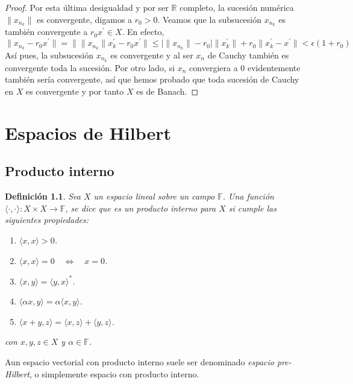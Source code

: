 \documentclass[12pt]{book}
\newtheorem{defn}{\bf Definición}[chapter]
\def\RR{\mathbb{R}}
\def\FF{\mathbb{F}}
\newcommand{\abs}[1]{\lvert #1\rvert }
\newcommand{\norm}[1]{\lVert #1\rVert }
\begin{document}
\begin{proof}
Por esta última desigualdad y por ser $\RR$ completo, la sucesión numérica $\norm{x_{n_k}}$ es convergente, digamos a $r_0>0$. Veamos que la subsucesión $x_{n_k}$ es también convergente a  $r_0 x^\prime \in X$. En efecto,
$$\norm{x_{n_k}-r_0 x^\prime}=\norm{\norm{x_{n_k}} x^\prime_k -r_0x^\prime}\leq \abs{\norm{x_{n_k}} -r_0}\norm{x^\prime_k}+r_0\norm{x^\prime_k- x^\prime} < \epsilon (1 + r_0)$$ 
Así pues, la subsucesión $x_{n_k}$  es convergente y al ser  $x_n$ de Cauchy también es convergente toda la sucesión. Por otro lado, si  $x_n$ convergiera a $0$ evidentemente también sería convergente, así que hemos probado que toda sucesión de Cauchy en $X$ es convergente y por tanto $X$ es de Banach.
\end{proof}
 
\chapter{Espacios de Hilbert}

\section{Producto interno}
\begin{defn} Sea $X$ un espacio lineal sobre un campo $\FF$. Una función $\langle \cdot,
\cdot\rangle: X\times X\longrightarrow \FF$, se dice que es un producto interno para $X$  si cumple 
las siguientes propiedades:
\begin{enumerate}
\renewcommand{\labelenumi}{\textrm{\bf PI}\arabic{enumi}.}
\item $\langle  x, x\rangle >0$.
\item $\langle x, x\rangle =0\quad \Leftrightarrow\quad x=0$.
\item $\langle x,y\rangle=\langle y,x\rangle^*$.
\item $\langle\alpha x, y\rangle =\alpha \langle x,y\rangle$.
\item $\langle x + y, z\rangle = \langle x,z\rangle+\langle y,z\rangle$.
\end{enumerate}
con $x,y,z\in X$ y  $\alpha\in \FF$.
\end{defn}

Aun espacio vectorial con producto interno suele ser denominado {\it espacio pre-Hilbert}, o simplemente espacio con producto interno.
\end{document}
